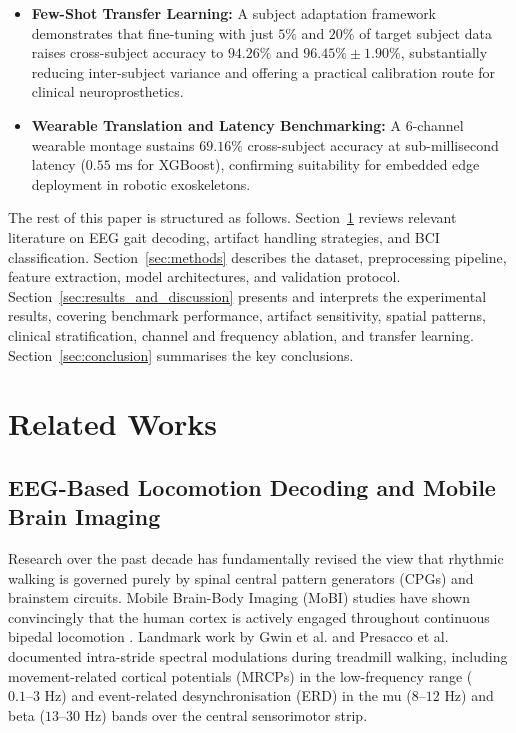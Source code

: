 \documentclass[11pt,a4paper]{article}
\begin{document}
\begin{itemize}
    \item \textbf{Few-Shot Transfer Learning:} A subject adaptation framework demonstrates that fine-tuning with just $5\%$ and $20\%$ of target subject data raises cross-subject accuracy to $94.26\%$ and $96.45\% \pm 1.90\%$, substantially reducing inter-subject variance and offering a practical calibration route for clinical neuroprosthetics.
    \item \textbf{Wearable Translation and Latency Benchmarking:} A 6-channel wearable montage sustains $69.16\%$ cross-subject accuracy at sub-millisecond latency ($0.55\text{ ms}$ for XGBoost), confirming suitability for embedded edge deployment in robotic exoskeletons.
\end{itemize}

The rest of this paper is structured as follows. Section~\ref{sec:related_works} reviews relevant literature on EEG gait decoding, artifact handling strategies, and BCI classification. Section~\ref{sec:methods} describes the dataset, preprocessing pipeline, feature extraction, model architectures, and validation protocol. Section~\ref{sec:results_and_discussion} presents and interprets the experimental results, covering benchmark performance, artifact sensitivity, spatial patterns, clinical stratification, channel and frequency ablation, and transfer learning. Section~\ref{sec:conclusion} summarises the key conclusions.


\section{Related Works}
\label{sec:related_works}

\subsection{EEG-Based Locomotion Decoding and Mobile Brain Imaging}
Research over the past decade has fundamentally revised the view that rhythmic walking is governed purely by spinal central pattern generators (CPGs) and brainstem circuits. Mobile Brain-Body Imaging (MoBI) studies have shown convincingly that the human cortex is actively engaged throughout continuous bipedal locomotion \cite{makeig2009mobi, gwin2011electrocortical}. Landmark work by Gwin et al. \cite{gwin2011electrocortical} and Presacco et al. \cite{presacco2011decoding} documented intra-stride spectral modulations during treadmill walking, including movement-related cortical potentials (MRCPs) in the low-frequency range ($0.1\text{--}3\text{ Hz}$) and event-related desynchronisation (ERD) in the mu ($8\text{--}12\text{ Hz}$) and beta ($13\text{--}30\text{ Hz}$) bands over the central sensorimotor strip.
\end{document}
